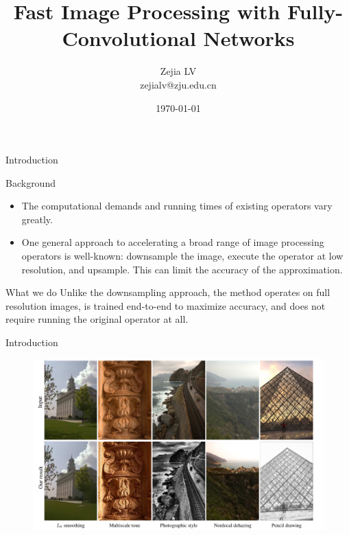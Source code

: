 \documentclass[notes]{beamer}
\title[]{Fast Image Processing with Fully-Convolutional Networks}
\author[Zejia LV]{Zejia LV \\ zejialv@zju.edu.cn}
\date[\today]{\today}
\begin{document}
\begin{frame}
	\titlepage
\end{frame}


\begin{frame}{Introduction}
	\begin{block}{Background}
	\begin{itemize}
		\item  	The computational demands and running times of existing operators vary greatly. 
		\item One general approach to accelerating a broad range of image processing operators is well-known: downsample the image, execute the operator at low resolution, and upsample. This can limit the accuracy of the approximation.
	\end{itemize}
	
	\end{block}	
	\begin{block}{What we do}
		Unlike the downsampling approach, the method operates on full resolution images, is trained end-to-end to maximize accuracy, and does not require running the original operator at all.
	\end{block}
\end{frame}

\begin{frame}{Introduction}
	\begin{figure}
			\includegraphics[width=1.0\textwidth]{1.png}
	\end{figure}	
\end{frame}
\end{document}
